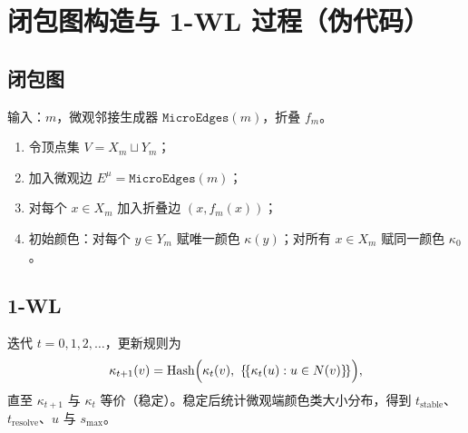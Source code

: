 
\section{闭包图构造与 1-WL 过程（伪代码）}
\label{app:pseudo}

\subsection{闭包图}

输入：$m$，微观邻接生成器 $\texttt{MicroEdges}(m)$，折叠 $f_m$。
\begin{enumerate}
  \item 令顶点集 $V=X_m\sqcup Y_m$；
  \item 加入微观边 $E^{\mu}=\texttt{MicroEdges}(m)$；
  \item 对每个 $x\in X_m$ 加入折叠边 $(x,f_m(x))$；
  \item 初始颜色：对每个 $y\in Y_m$ 赋唯一颜色 $\kappa(y)$；对所有 $x\in X_m$ 赋同一颜色 $\kappa_0$。
\end{enumerate}

\subsection{1-WL}

迭代 $t=0,1,2,\dots$，更新规则为
\[
\kappa_{t+1}(v)=\mathrm{Hash}\Bigl(\kappa_t(v),\ \multiset{\kappa_t(u):u\in N(v)}\Bigr),
\]
直至 $\kappa_{t+1}$ 与 $\kappa_t$ 等价（稳定）。稳定后统计微观端颜色类大小分布，得到 $t_{\mathrm{stable}}$、$t_{\mathrm{resolve}}$、$u$ 与 $s_{\max}$。

